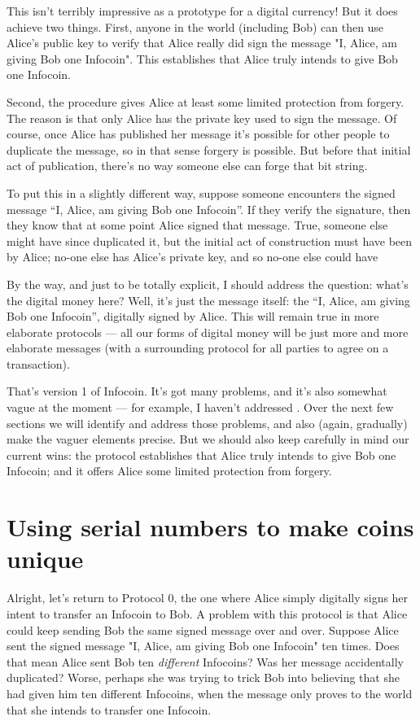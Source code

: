 \documentclass[12pt]{book}
\newcounter{problem}[chapter]
\newcounter{example}[chapter]
\begin{document}
This isn't terribly impressive as a prototype for a digital currency!
But it does achieve two things.  First, anyone in the world (including
Bob) can then use Alice's public key to verify that Alice really did
sign the message "I, Alice, am giving Bob one Infocoin".  This
establishes that Alice truly intends to give Bob one Infocoin.

Second, the procedure gives Alice at least some limited protection
from forgery.  The reason is that only Alice has the private key used
to sign the message.  Of course, once Alice has published her message
it's possible for other people to duplicate the message, so in that
sense forgery is possible.  But before that initial act of
publication, there's no way someone else can forge that bit string.

To put this in a slightly different way, suppose someone encounters
the signed message ``I, Alice, am giving Bob one Infocoin''.  If they
verify the signature, then they know that at some point Alice signed
that message.  True, someone else might have since duplicated it, but
the initial act of construction must have been by Alice; no-one else
has Alice's private key, and so no-one else could have 

By the way, and just to be totally explicit, I should address the
question: what's the digital money here?  Well, it's just the message
itself: the ``I, Alice, am giving Bob one Infocoin'', digitally signed
by Alice.  This will remain true in more elaborate protocols --- all
our forms of digital money will be just more and more elaborate
messages (with a surrounding protocol for all parties to agree on a
transaction).

That's version 1 of Infocoin.  It's got many problems, and it's also
somewhat vague at the moment --- for example, I haven't addressed .
Over the next few sections we will identify and address those
problems, and also (again, gradually) make the vaguer elements
precise.  But we should also keep carefully in mind our current wins:
the protocol establishes that Alice truly intends to give Bob one
Infocoin; and it offers Alice some limited protection from forgery.

\section{Using serial numbers to make coins unique}

Alright, let's return to Protocol 0, the one where Alice simply
digitally signs her intent to transfer an Infocoin to Bob.  A problem
with this protocol is that Alice could keep sending Bob the same
signed message over and over.  Suppose Alice sent the signed message
"I, Alice, am giving Bob one Infocoin" ten times.  Does that mean
Alice sent Bob ten \emph{different} Infocoins?  Was her message
accidentally duplicated?  Worse, perhaps she was trying to trick Bob
into believing that she had given him ten different Infocoins, when
the message only proves to the world that she intends to transfer one
Infocoin.
\end{document}
